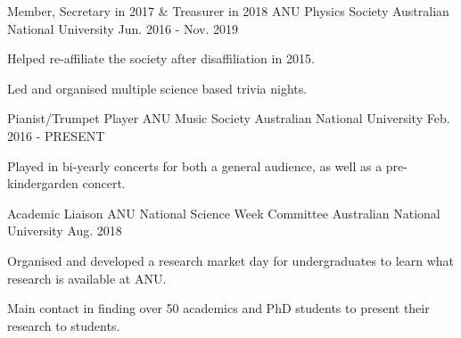 
\begin{cventries}

  \cventry
    {Member, Secretary in 2017 \& Treasurer in 2018} %
    {ANU Physics Society} %
    {Australian National University} %
    {Jun. 2016 - Nov. 2019} %
    {
      \begin{cvitems} %
        \item {Helped re-affiliate the society after disaffiliation in 2015.}
        \item {Led and organised multiple science based trivia nights.}
      \end{cvitems}
    }

  \cventry
    {Pianist/Trumpet Player} %
    {ANU Music Society} %
    {Australian National University} %
    {Feb. 2016 - PRESENT} %
    {
      \begin{cvitems} %
        \item {Played in bi-yearly concerts for both a general audience, as well as a pre-kindergarden concert.}
      \end{cvitems}
    }
    
  \cventry
    {Academic Liaison} %
    {ANU National Science Week Committee} %
    {Australian National University} %
    {Aug. 2018} %
    {
      \begin{cvitems} %
        \item {Organised and developed a research market day for undergraduates to learn what research is available at ANU.}
        \item {Main contact in finding over 50 academics and PhD students to present their research to students.}
      \end{cvitems}
    }


\end{cventries}
